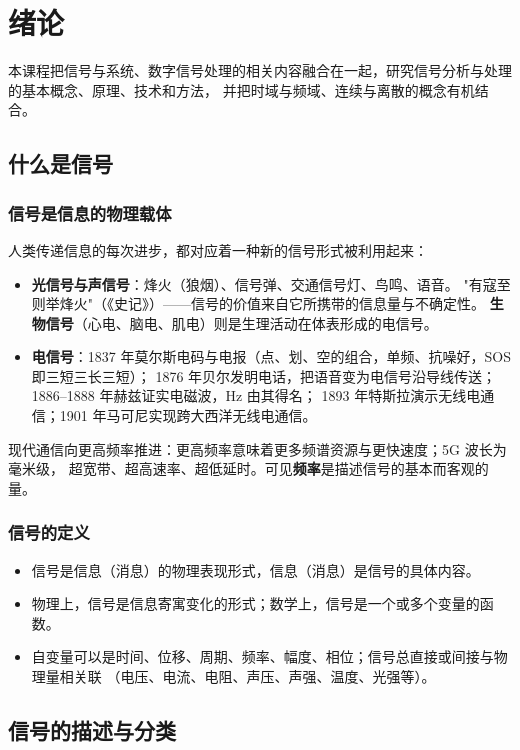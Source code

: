 \chapter{绪论}

本课程把信号与系统、数字信号处理的相关内容融合在一起，研究信号分析与处理的基本概念、原理、技术和方法，
并把时域与频域、连续与离散的概念有机结合。

\section{什么是信号}

\subsection{信号是信息的物理载体}

人类传递信息的每次进步，都对应着一种新的信号形式被利用起来：
\begin{itemize}
\item \textbf{光信号与声信号}：烽火（狼烟）、信号弹、交通信号灯、鸟鸣、语音。
  "有寇至则举烽火"（《史记》）——信号的价值来自它所携带的信息量与不确定性。
  \textbf{生物信号}（心电、脑电、肌电）则是生理活动在体表形成的电信号。
\item \textbf{电信号}：1837 年莫尔斯电码与电报（点、划、空的组合，单频、抗噪好，SOS 即三短三长三短）；
  1876 年贝尔发明电话，把语音变为电信号沿导线传送；1886--1888 年赫兹证实电磁波，Hz 由其得名；
  1893 年特斯拉演示无线电通信；1901 年马可尼实现跨大西洋无线电通信。
\end{itemize}
现代通信向更高频率推进：更高频率意味着更多频谱资源与更快速度；5G 波长为毫米级，
超宽带、超高速率、超低延时。可见\textbf{频率}是描述信号的基本而客观的量。

\subsection{信号的定义}

\begin{itemize}
\item 信号是信息（消息）的物理表现形式，信息（消息）是信号的具体内容。
\item 物理上，信号是信息寄寓变化的形式；数学上，信号是一个或多个变量的函数。
\item 自变量可以是时间、位移、周期、频率、幅度、相位；信号总直接或间接与物理量相关联
  （电压、电流、电阻、声压、声强、温度、光强等）。
\end{itemize}

\section{信号的描述与分类}

